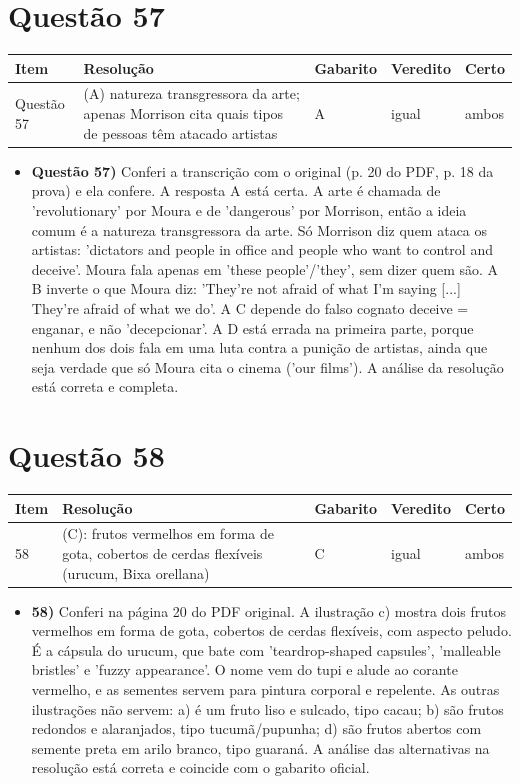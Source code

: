 \documentclass{article}%
\begin{document}
\section*{Questão 57}%
\begin{longtable}{@{}p{} p{} p{} p{} p{}@{}}\toprule Item & Resolução & Gabarito & Veredito & Certo \\ \midrule
Questão 57 & (A) natureza transgressora da arte; apenas Morrison cita quais tipos de pessoas têm atacado artistas & A & igual & ambos \\
\bottomrule\end{longtable}%
\begin{itemize}%
\item%
\textbf{Questão 57)} Conferi a transcrição com o original (p. 20 do PDF, p. 18 da prova) e ela confere. A resposta A está certa. A arte é chamada de 'revolutionary' por Moura e de 'dangerous' por Morrison, então a ideia comum é a natureza transgressora da arte. Só Morrison diz quem ataca os artistas: 'dictators and people in office and people who want to control and deceive'. Moura fala apenas em 'these people'/'they', sem dizer quem são. A B inverte o que Moura diz: 'They're not afraid of what I'm saying {[}...{]} They're afraid of what we do'. A C depende do falso cognato deceive = enganar, e não 'decepcionar'. A D está errada na primeira parte, porque nenhum dos dois fala em uma luta contra a punição de artistas, ainda que seja verdade que só Moura cita o cinema ('our films'). A análise da resolução está correta e completa.%
\end{itemize}%
\section*{Questão 58}%
\begin{longtable}{@{}p{} p{} p{} p{} p{}@{}}\toprule Item & Resolução & Gabarito & Veredito & Certo \\ \midrule
58 & (C): frutos vermelhos em forma de gota, cobertos de cerdas flexíveis (urucum, Bixa orellana) & C & igual & ambos \\
\bottomrule\end{longtable}%
\begin{itemize}%
\item%
\textbf{58)} Conferi na página 20 do PDF original. A ilustração c) mostra dois frutos vermelhos em forma de gota, cobertos de cerdas flexíveis, com aspecto peludo. É a cápsula do urucum, que bate com 'teardrop{-}shaped capsules', 'malleable bristles' e 'fuzzy appearance'. O nome vem do tupi e alude ao corante vermelho, e as sementes servem para pintura corporal e repelente. As outras ilustrações não servem: a) é um fruto liso e sulcado, tipo cacau; b) são frutos redondos e alaranjados, tipo tucumã/pupunha; d) são frutos abertos com semente preta em arilo branco, tipo guaraná. A análise das alternativas na resolução está correta e coincide com o gabarito oficial.%
\end{itemize}%
\end{document}
